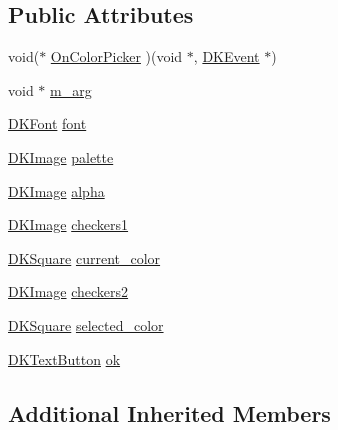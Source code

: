 \subsection*{Public Attributes}
\begin{DoxyCompactItemize}
\item 
void($\ast$ \hyperlink{class_d_k_color_picker_aedb0961fdfaed5d6f21bb31a51df3f7b}{On\-Color\-Picker} )(void $\ast$, \hyperlink{class_d_k_event}{D\-K\-Event} $\ast$)
\item 
void $\ast$ \hyperlink{class_d_k_color_picker_a560f58119ce901c3b4adc7c25b6680ae}{m\-\_\-arg}
\item 
\hyperlink{class_d_k_font}{D\-K\-Font} \hyperlink{class_d_k_color_picker_af3a1bc4a39f8a262febd12cc14310963}{font}
\item 
\hyperlink{class_d_k_image}{D\-K\-Image} \hyperlink{class_d_k_color_picker_a00ef57610642745db44a477ada9da610}{palette}
\item 
\hyperlink{class_d_k_image}{D\-K\-Image} \hyperlink{class_d_k_color_picker_abfc3a9740a566b1e3d505f055ee3690a}{alpha}
\item 
\hyperlink{class_d_k_image}{D\-K\-Image} \hyperlink{class_d_k_color_picker_a651f66c199ad4886c09d532775262b7b}{checkers1}
\item 
\hyperlink{class_d_k_square}{D\-K\-Square} \hyperlink{class_d_k_color_picker_aacce85e3f5c5e1f45a456a96484bccb7}{current\-\_\-color}
\item 
\hyperlink{class_d_k_image}{D\-K\-Image} \hyperlink{class_d_k_color_picker_a13a4259afa8fb58ed8b371d6dba32f91}{checkers2}
\item 
\hyperlink{class_d_k_square}{D\-K\-Square} \hyperlink{class_d_k_color_picker_ab243ee53e2392d8496e0ff53910aa1af}{selected\-\_\-color}
\item 
\hyperlink{class_d_k_text_button}{D\-K\-Text\-Button} \hyperlink{class_d_k_color_picker_ac5b7a15c4d4cb455a1411967265e62b0}{ok}
\end{DoxyCompactItemize}
\subsection*{Additional Inherited Members}


